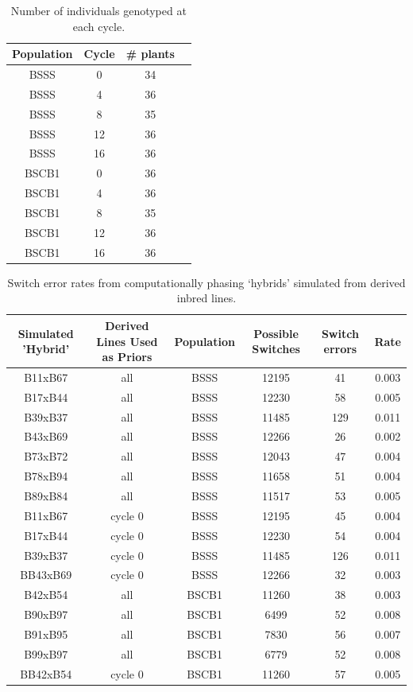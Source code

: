 \clearpage

\begin{table}
\caption{Number of individuals genotyped at each cycle.}
\centering
\begin{tabular}{  cccc }
	Population  & Cycle & \# plants &   \\ \hline
	BSSS & 0 & 34 &  \\ 
	BSSS & 4 & 36 &  \\ 
	BSSS & 8 & 35 &  \\ 
	BSSS & 12 & 36 &  \\ 
	BSSS & 16 & 36 &  \\ 
	BSCB1 & 0 & 36 &  \\ 
	BSCB1 & 4 & 36 &  \\ 
	BSCB1 & 8 & 35 &  \\ 
	BSCB1 & 12 & 36 &  \\ 
	BSCB1 & 16 & 36 &  \\ 
\end{tabular}
\label{tab:plants}
\end{table}
\clearpage


\begin{table}
\caption{Switch error rates from computationally phasing ‘hybrids’ simulated from derived inbred lines.}
\centering

\begin{tabular}{ cccccc  }
	{Simulated 'Hybrid'} & {Derived Lines Used as Priors} & {Population} & {Possible Switches} & {Switch errors} & {Rate} \\ \hline
	B11xB67 & all & BSSS & 12195 & 41 & 0.003 \\ 
	B17xB44 & all & BSSS & 12230 & 58 & 0.005 \\ 
	B39xB37 & all & BSSS & 11485 & 129 & 0.011 \\ 
	B43xB69 & all & BSSS & 12266 & 26 & 0.002 \\ 
	B73xB72 & all & BSSS & 12043 & 47 & 0.004 \\ 
	B78xB94 & all & BSSS & 11658 & 51 & 0.004 \\ 
	B89xB84 & all & BSSS & 11517 & 53 & 0.005 \\ 
	B11xB67 & cycle 0 & BSSS & 12195 & 45 & 0.004 \\ 
	B17xB44 & cycle 0 & BSSS & 12230 & 54 & 0.004 \\ 
	B39xB37 & cycle 0 & BSSS & 11485 & 126 & 0.011 \\ 
	BB43xB69 & cycle 0 & BSSS & 12266 & 32 & 0.003 \\ 
	B42xB54 & all & BSCB1 & 11260 & 38 & 0.003 \\ 
	B90xB97 & all & BSCB1 & 6499 & 52 & 0.008 \\ 
	B91xB95 & all & BSCB1 & 7830 & 56 & 0.007 \\ 
	B99xB97 & all & BSCB1 & 6779 & 52 & 0.008 \\ 
	BB42xB54 & cycle 0 & BSCB1 & 11260 & 57 & 0.005 \\\hline
\end{tabular}
	\label{tab:phase_error}  %
\end{table}

